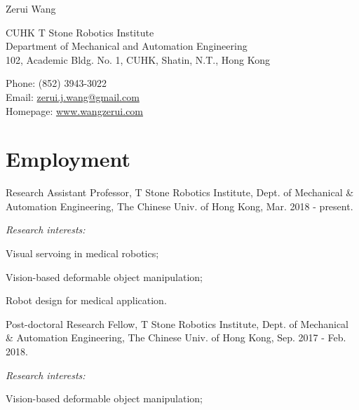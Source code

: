 \documentclass[10pt,letterpaper]{article}
\def\name{Zerui Wang}
\renewenvironment{itemize}{
\begin{list}{}{
    \setlength{\leftmargin}{1.5em}
    \setlength{\itemsep}{0.25em}
    \setlength{\parskip}{0pt}
    \setlength{\parsep}{0.25em}
    }
    }{
\end{list}
}
\begin{document}
{\huge \name}


\bigskip

\begin{minipage}[t]{0.595\textwidth}
    CUHK T Stone Robotics Institute \\
    Department of Mechanical and Automation Engineering \\
    102, Academic Bldg. No. 1, CUHK, Shatin, N.T., Hong Kong
\end{minipage}
\begin{minipage}[t]{0.395\textwidth}
    Phone: (852) 3943-3022 \\
    Email: \href{mailto:zerui.j.wang@gmail.com}{zerui.j.wang@gmail.com} \\
    Homepage: \href{http://www.wangzerui.com/}{www.wangzerui.com}
\end{minipage}

\section*{Employment}

\begin{itemize}
    \item Research Assistant Professor, T Stone Robotics Institute, Dept. of Mechanical \& Automation Engineering, The Chinese Univ. of Hong Kong, Mar. 2018 - present.
    \begin{itemize}
        \item \emph{Research interests:}
        \begin{itemize}
            \item Visual servoing in medical robotics;
            \item Vision-based deformable object manipulation;
            \item Robot design for medical application.
        \end{itemize}
    \end{itemize}
\end{itemize}

\begin{itemize}
    \item Post-doctoral Research Fellow, T Stone Robotics Institute, Dept. of Mechanical \& Automation Engineering, The Chinese Univ. of Hong Kong, Sep. 2017 - Feb. 2018.
    \begin{itemize}
        \item \emph{Research interests:}
        \begin{itemize}
            \item Vision-based deformable object manipulation;
        \end{itemize}
    \end{itemize}
\end{itemize}
\end{document}
